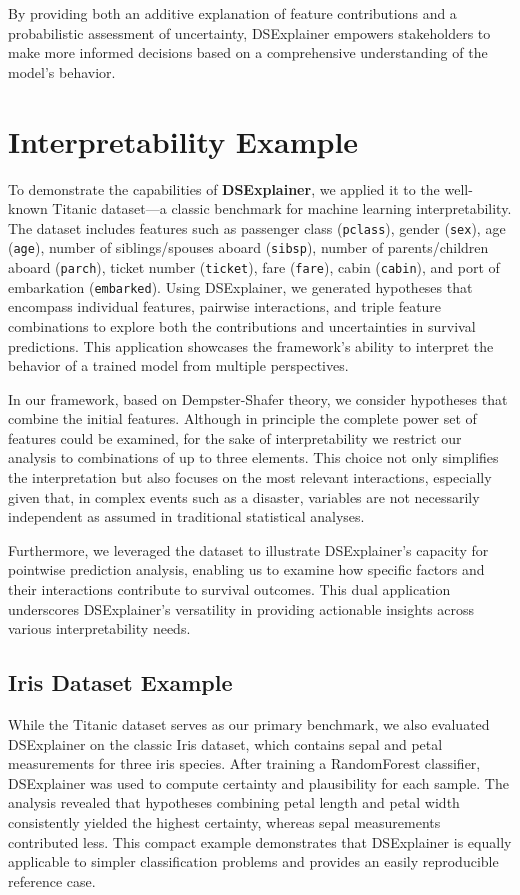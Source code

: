 \documentclass[acmlarge]{acmart}
\begin{document}
By providing both an additive explanation of feature contributions and a probabilistic assessment of uncertainty, DSExplainer empowers stakeholders to make more informed decisions based on a comprehensive understanding of the model’s behavior.
\section{Interpretability Example}

To demonstrate the capabilities of \textbf{DSExplainer}, we applied it to the well-known Titanic dataset—a classic benchmark for machine learning interpretability. The dataset includes features such as passenger class (\texttt{pclass}), gender (\texttt{sex}), age (\texttt{age}), number of siblings/spouses aboard (\texttt{sibsp}), number of parents/children aboard (\texttt{parch}), ticket number (\texttt{ticket}), fare (\texttt{fare}), cabin (\texttt{cabin}), and port of embarkation (\texttt{embarked}). Using DSExplainer, we generated hypotheses that encompass individual features, pairwise interactions, and triple feature combinations to explore both the contributions and uncertainties in survival predictions. This application showcases the framework's ability to interpret the behavior of a trained model from multiple perspectives.

In our framework, based on Dempster-Shafer theory, we consider hypotheses that combine the initial features. Although in principle the complete power set of features could be examined, for the sake of interpretability we restrict our analysis to combinations of up to three elements. This choice not only simplifies the interpretation but also focuses on the most relevant interactions, especially given that, in complex events such as a disaster, variables are not necessarily independent as assumed in traditional statistical analyses.

Furthermore, we leveraged the dataset to illustrate DSExplainer's capacity for pointwise prediction analysis, enabling us to examine how specific factors and their interactions contribute to survival outcomes. This dual application underscores DSExplainer's versatility in providing actionable insights across various interpretability needs.

\subsection{Iris Dataset Example}

While the Titanic dataset serves as our primary benchmark, we also evaluated DSExplainer on the classic Iris dataset, which contains sepal and petal measurements for three iris species. After training a RandomForest classifier, DSExplainer was used to compute certainty and plausibility for each sample. The analysis revealed that hypotheses combining petal length and petal width consistently yielded the highest certainty, whereas sepal measurements contributed less. This compact example demonstrates that DSExplainer is equally applicable to simpler classification problems and provides an easily reproducible reference case.
\end{document}
